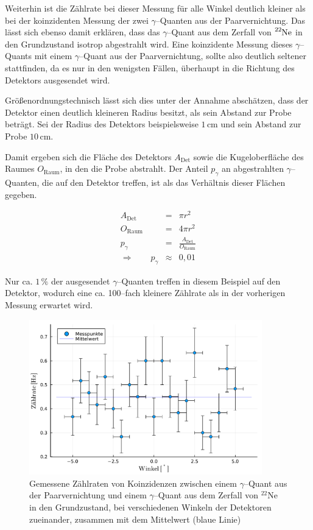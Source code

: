 \documentclass[12pt,a4paper]{scrartcl}
\numberwithin{equation}{section} %
\begin{document}
Weiterhin ist die Zählrate bei dieser Messung für alle Winkel deutlich kleiner als bei der koinzidenten Messung der zwei $\gamma$--Quanten aus der Paarvernichtung. Das lässt sich ebenso damit erklären, dass das $\gamma$--Quant aus dem Zerfall von $\ce{^{22}Ne}$ in den Grundzustand isotrop abgestrahlt wird. Eine koinzidente Messung dieses $\gamma$--Quants mit einem $\gamma$--Quant aus der Paarvernichtung, sollte also deutlich seltener stattfinden, da es nur in den wenigsten Fällen, überhaupt in die Richtung des Detektors ausgesendet wird.

Größenordnungstechnisch lässt sich dies unter der Annahme abschätzen, dass der Detektor einen deutlich kleineren Radius besitzt, als sein Abstand zur Probe beträgt. Sei der Radius des Detektors beispielsweise $1 \mathrm{\, cm}$ und sein Abstand zur Probe $10 \mathrm{\, cm}$.

Damit ergeben sich die Fläche des Detektors $A_\mathrm{Det}$ sowie die Kugeloberfläche des Raumes $O_\mathrm{Raum}$, in den die Probe abstrahlt. Der Anteil $p_\gamma$ an abgestrahlten $\gamma$--Quanten, die auf den Detektor treffen, ist als das Verhältnis dieser Flächen gegeben.

\begin{eqnarray}
	A_\mathrm{Det} &=& \pi r^2 \\
	O_\mathrm{Raum} &=& 4 \pi r^2 \\
	p_\gamma &=& \frac{A_\mathrm{Det}}{O_\mathrm{Raum}} \\
	\Rightarrow \qquad p_\gamma &\approx& 0,01
\end{eqnarray}

\noindent
Nur ca. $1 \mathrm{\, \%}$ der ausgesendet $\gamma$--Quanten treffen in diesem Beispiel auf den Detektor, wodurch eine ca. 100--fach kleinere Zählrate als in der vorherigen Messung erwartet wird.

\begin{figure}[h]
	\centering
	\includegraphics[width=0.9\textwidth]{../media/B3.4/plot1275.pdf}
	\caption{Gemessene Zählraten von Koinzidenzen zwischen einem $\gamma$--Quant aus der Paarvernichtung und einem $\gamma$--Quant aus dem Zerfall von $^{22}$Ne in den Grundzustand, bei verschiedenen Winkeln der Detektoren zueinander, zusammen mit dem Mittelwert (blaue Linie)}
	\label{fig:plot1275}
\end{figure}
\end{document}
